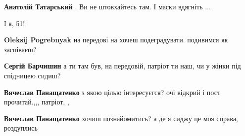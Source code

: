 \begin{itemize}
\begin{itemize}
\begin{itemize}
\textbf{Анатолій Татарський} . Ви не штовхайтесь там. І маски вдягніть
...

 
І я, 51!
\end{itemize}

\end{itemize}

 
\textbf{Oleksij Pogrebnyak} на передові на хочеш подеградувати. подивимся як заспіваєш?

\begin{itemize}
 
\textbf{Сергій Барчишин} а ти там був, на передовій, патріот ти наш, чи у жінки під спідницею сидиш?

 
\textbf{Вячеслав Панащатенко} з якою цілью інтересуєгся? очі відкрий і пост прочитай.,,, патріот, ,

 
\textbf{Вячеслав Панащатенко} хочиш познайомитись? а де я сиджу це моя справа, роздуплись

 

\end{itemize}
\end{itemize}
